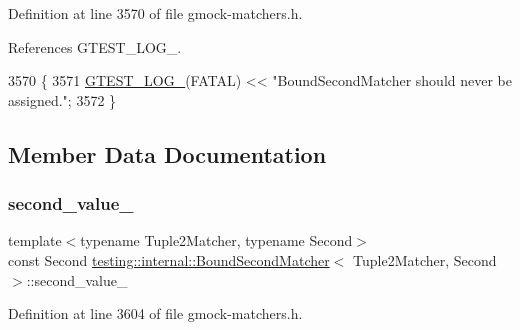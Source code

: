 Definition at line 3570 of file gmock-\/matchers.\+h.



References G\+T\+E\+S\+T\+\_\+\+L\+O\+G\+\_\+.


\begin{DoxyCode}
3570                                               \{
3571     \hyperlink{gtest-port_8h_a8ef4cb4c465db8c15464aecc6d9510ef}{GTEST\_LOG\_}(FATAL) << \textcolor{stringliteral}{"BoundSecondMatcher should never be assigned."};
3572   \}
\end{DoxyCode}


\subsection{Member Data Documentation}
\mbox{\label{classtesting_1_1internal_1_1BoundSecondMatcher_a5b0de81ac5ff6e7d9e21cb8bfeaacaf5}} 
\subsubsection{\texorpdfstring{second\+\_\+value\+\_\+}{second\_value\_}}
{\footnotesize\ttfamily template$<$typename Tuple2\+Matcher, typename Second$>$ \\
const Second \hyperlink{classtesting_1_1internal_1_1BoundSecondMatcher}{testing\+::internal\+::\+Bound\+Second\+Matcher}$<$ Tuple2\+Matcher, Second $>$\+::second\+\_\+value\+\_\+\hspace{0.3cm}{\ttfamily [private]}}



Definition at line 3604 of file gmock-\/matchers.\+h.

\mbox{\label{classtesting_1_1internal_1_1BoundSecondMatcher_a4e73978cc5f6972a37b01832380f099e}} 
